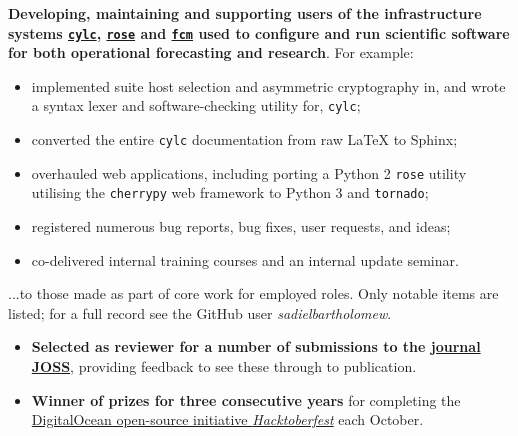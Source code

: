 \documentclass[10pt,a4paper]{cv_template}
\begin{document}
\begin{paracol}{2}
\divider

\textbf{Developing, maintaining and supporting users of the infrastructure systems \href{https://github.com/cylc}{\texttt{cylc}}, \href{https://github.com/metomi/rose}{\texttt{rose}} and \href{https://github.com/metomi/fcm}{\texttt{fcm}} used to configure and run scientific software for both operational forecasting and research}. For example:
\begin{itemize}
  \itemsep0em
  \item implemented suite host selection and asymmetric cryptography in, and wrote a syntax lexer and software-checking utility for, \texttt{cylc};
  \item converted the entire \texttt{cylc} documentation from raw \LaTeX \hspace{0.1em} to Sphinx;
  \item overhauled web applications, including porting a Python 2 \texttt{rose} utility utilising the \texttt{cherrypy} web framework to Python 3 and \texttt{tornado};
  \item registered numerous bug reports, bug fixes, user requests, and ideas;
  \item co-delivered internal training courses and an internal update seminar.
\end{itemize}



...to those made as part of core work for employed roles. Only notable items are listed; for a full record see the GitHub user \textit{sadielbartholomew}.

\vspace{1em}

\begin{itemize}
  \item \textbf{Selected as reviewer for a number of submissions to the \href{https://joss.theoj.org/}{journal JOSS}}, providing feedback to see these through to publication.
\end{itemize}

\divider

\begin{itemize}
  \item \textbf{Winner of prizes for three consecutive years} for completing the \href{https://hacktoberfest.digitalocean.com/}{DigitalOcean open-source initiative  \textit{Hacktoberfest}} each October.
\end{itemize}


\end{paracol}
\end{document}
